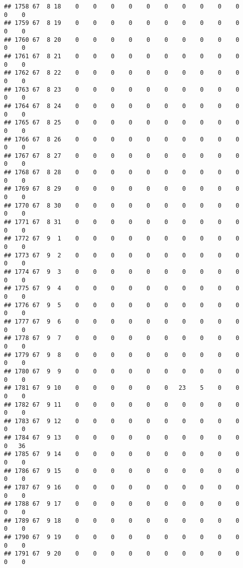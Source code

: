 \documentclass[]{article}
\begin{document}
\begin{verbatim}
## 1758 67  8 18    0    0    0    0    0    0    0    0    0    0    0    0
## 1759 67  8 19    0    0    0    0    0    0    0    0    0    0    0    0
## 1760 67  8 20    0    0    0    0    0    0    0    0    0    0    0    0
## 1761 67  8 21    0    0    0    0    0    0    0    0    0    0    0    0
## 1762 67  8 22    0    0    0    0    0    0    0    0    0    0    0    0
## 1763 67  8 23    0    0    0    0    0    0    0    0    0    0    0    0
## 1764 67  8 24    0    0    0    0    0    0    0    0    0    0    0    0
## 1765 67  8 25    0    0    0    0    0    0    0    0    0    0    0    0
## 1766 67  8 26    0    0    0    0    0    0    0    0    0    0    0    0
## 1767 67  8 27    0    0    0    0    0    0    0    0    0    0    0    0
## 1768 67  8 28    0    0    0    0    0    0    0    0    0    0    0    0
## 1769 67  8 29    0    0    0    0    0    0    0    0    0    0    0    0
## 1770 67  8 30    0    0    0    0    0    0    0    0    0    0    0    0
## 1771 67  8 31    0    0    0    0    0    0    0    0    0    0    0    0
## 1772 67  9  1    0    0    0    0    0    0    0    0    0    0    0    0
## 1773 67  9  2    0    0    0    0    0    0    0    0    0    0    0    0
## 1774 67  9  3    0    0    0    0    0    0    0    0    0    0    0    0
## 1775 67  9  4    0    0    0    0    0    0    0    0    0    0    0    0
## 1776 67  9  5    0    0    0    0    0    0    0    0    0    0    0    0
## 1777 67  9  6    0    0    0    0    0    0    0    0    0    0    0    0
## 1778 67  9  7    0    0    0    0    0    0    0    0    0    0    0    0
## 1779 67  9  8    0    0    0    0    0    0    0    0    0    0    0    0
## 1780 67  9  9    0    0    0    0    0    0    0    0    0    0    0    0
## 1781 67  9 10    0    0    0    0    0    0   23    5    0    0    0    0
## 1782 67  9 11    0    0    0    0    0    0    0    0    0    0    0    0
## 1783 67  9 12    0    0    0    0    0    0    0    0    0    0    0    0
## 1784 67  9 13    0    0    0    0    0    0    0    0    0    0    0   36
## 1785 67  9 14    0    0    0    0    0    0    0    0    0    0    0    0
## 1786 67  9 15    0    0    0    0    0    0    0    0    0    0    0    0
## 1787 67  9 16    0    0    0    0    0    0    0    0    0    0    0    0
## 1788 67  9 17    0    0    0    0    0    0    0    0    0    0    0    0
## 1789 67  9 18    0    0    0    0    0    0    0    0    0    0    0    0
## 1790 67  9 19    0    0    0    0    0    0    0    0    0    0    0    0
## 1791 67  9 20    0    0    0    0    0    0    0    0    0    0    0    0

\end{verbatim}
\end{document}

